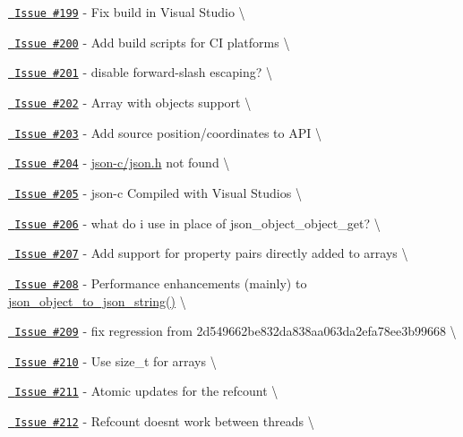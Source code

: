 \begin{DoxyItemize}
\item \href{https://github.com/json-c/json-c/issues/199}{\texttt{ Issue \#199}} -\/ Fix build in Visual Studio \textbackslash{}
\item \href{https://github.com/json-c/json-c/issues/200}{\texttt{ Issue \#200}} -\/ Add build scripts for CI platforms \textbackslash{}
\item \href{https://github.com/json-c/json-c/issues/201}{\texttt{ Issue \#201}} -\/ disable forward-\/slash escaping? \textbackslash{}
\item \href{https://github.com/json-c/json-c/issues/202}{\texttt{ Issue \#202}} -\/ Array with objects support \textbackslash{}
\item \href{https://github.com/json-c/json-c/issues/203}{\texttt{ Issue \#203}} -\/ Add source position/coordinates to API \textbackslash{}
\item \href{https://github.com/json-c/json-c/issues/204}{\texttt{ Issue \#204}} -\/ \mbox{\hyperlink{json_8h}{json-\/c/json.\+h}} not found \textbackslash{}
\item \href{https://github.com/json-c/json-c/issues/205}{\texttt{ Issue \#205}} -\/ json-\/c Compiled with Visual Studios \textbackslash{}
\item \href{https://github.com/json-c/json-c/issues/206}{\texttt{ Issue \#206}} -\/ what do i use in place of json\+\_\+object\+\_\+object\+\_\+get? \textbackslash{}
\item \href{https://github.com/json-c/json-c/issues/207}{\texttt{ Issue \#207}} -\/ Add support for property pairs directly added to arrays \textbackslash{}
\item \href{https://github.com/json-c/json-c/issues/208}{\texttt{ Issue \#208}} -\/ Performance enhancements (mainly) to \mbox{\hyperlink{json__object_8h_ab7390c22baa1700d977c2af6b22d43a4}{json\+\_\+object\+\_\+to\+\_\+json\+\_\+string()}} \textbackslash{}
\item \href{https://github.com/json-c/json-c/issues/209}{\texttt{ Issue \#209}} -\/ fix regression from 2d549662be832da838aa063da2efa78ee3b99668 \textbackslash{}
\item \href{https://github.com/json-c/json-c/issues/210}{\texttt{ Issue \#210}} -\/ Use size\+\_\+t for arrays \textbackslash{}
\item \href{https://github.com/json-c/json-c/issues/211}{\texttt{ Issue \#211}} -\/ Atomic updates for the refcount \textbackslash{}
\item \href{https://github.com/json-c/json-c/issues/212}{\texttt{ Issue \#212}} -\/ Refcount doesn\textquotesingle{}t work between threads \textbackslash{}

\end{DoxyItemize}
